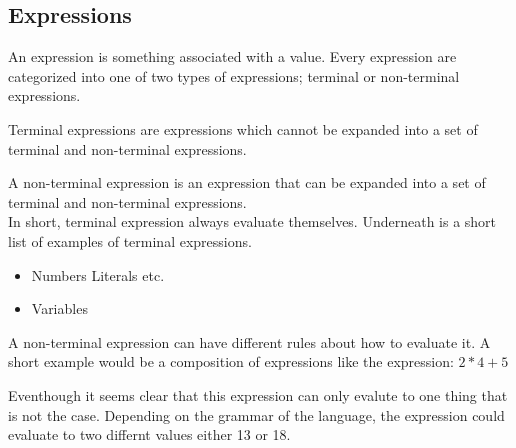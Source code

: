 \subsection{Expressions}
An expression is something associated with a value.
Every expression are categorized into one of two types
of expressions; terminal or non-terminal expressions.

Terminal expressions are expressions which cannot be 
expanded into a set of terminal and non-terminal expressions.

A non-terminal expression is an expression that can be 
expanded into a set of terminal and non-terminal expressions. \\

\noindent In short, terminal expression always evaluate themselves.
Underneath is a short list of examples of terminal expressions.
\begin{itemize}
  \item Numbers \textbar{} Literals etc.
  \item Variables
\end{itemize}

\noindent A non-terminal expression can have different rules about how to
evaluate it. A short example would be a composition of expressions
like the expression: $2 * 4 + 5$

Eventhough it seems clear that this expression can only evalute to
one thing that is not the case. Depending on the grammar of the language,
the expression could evaluate to two differnt values either 13 or 18.


